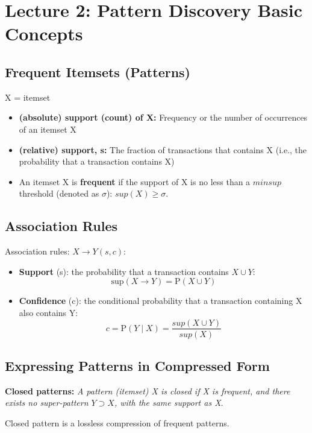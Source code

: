 \section{Lecture 2: Pattern Discovery Basic Concepts}
\subsection{Frequent Itemsets (Patterns)}

X = itemset

\begin{itemize}
\item \textbf{(absolute) support (count) of X:} Frequency or the number of occurrences of an itemset X
\item \textbf{(relative) support, s:} The fraction of transactions that contains X (i.e., the probability that a transaction contains X)
\item An itemset X is \textbf{frequent} if the support of X is no less than a $minsup$ threshold (denoted as $\sigma$): $sup(X) \geqslant \sigma$.
\end{itemize}

\subsection{Association Rules}
Association rules: $X \to Y (s, c)$:
\begin{itemize}
\item \textbf{Support} (s): the probability that a transaction contains $X \cup Y$:
\begin{equation*}
\mathrm{sup}(X \to Y) = \mathrm{P}(X \cup Y)
\end{equation*}

\item \textbf{Confidence} (c): the conditional probability that a transaction containing X also contains Y: 
\begin{equation*}
c = \mathrm{P}(Y \mid X) = \frac{sup(X \cup Y)}{sup(X)}
\end{equation*}
\end{itemize}

\subsection{Expressing Patterns in Compressed Form}
\begin{definition}
\textbf{Closed patterns:} \textit{A pattern (itemset) X is closed if X is frequent, and there exists no super-pattern $Y \supset X$, with the same support as X}.
\end{definition}
Closed pattern is a lossless compression of frequent patterns.

